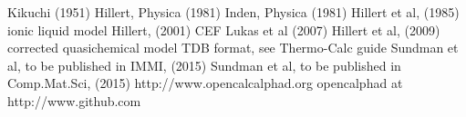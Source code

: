\documentclass[12pt]{article}
\begin{document}
\begin{thebibliography}{XXyyy}
 Kikuchi (1951)
 Hillert, Physica (1981)
 Inden, Physica (1981)
 Hillert et al, (1985) ionic liquid model
 Hillert, (2001) CEF
 Lukas et al (2007)
 Hillert et al, (2009) corrected quasichemical model
 TDB format, see Thermo-Calc guide
 Sundman et al, to be published in IMMI, (2015)
 Sundman et al, to be published in Comp.Mat.Sci, (2015)
 http://www.opencalcalphad.org
 opencalphad at http://www.github.com
\end{thebibliography}
\end{document}
